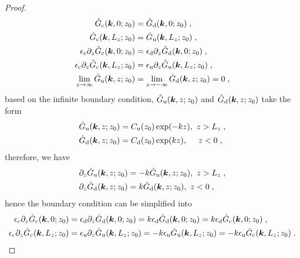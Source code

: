 \begin{proof}
    \begin{equation*}
        \begin{split}
            \Hat{G}_{\mathrm{c}}(\bm{k}, 0; z_0) &= \Hat{G}_{\mathrm{d}}(\bm{k}, 0; z_0)\;,\\
            \hat{G}_{\mathrm{c}}(\bm{k}, L_z; z_0) &= \hat{G}_{\mathrm{u}}(\bm{k}, L_z; z_0)\;,\\
            \epsilon_{\mathrm{c}} \partial_z\Hat{G}_{\mathrm{c}}(\bm{k}, 0; z_0) &= \epsilon_{\mathrm{d}} \partial_z\Hat{G}_{\mathrm{d}}(\bm{k}, 0; z_0)\;,\\
            \epsilon_{\mathrm{c}} \partial_z\Hat{G}_{\mathrm{c}}(\bm{k}, L_z; z_0) &= \epsilon_{\mathrm{u}} \partial_z\Hat{G}_{\mathrm{u}}(\bm{k}, L_z; z_0)\;,\\
            \lim_{z \to \infty} \Hat{G}_{\mathrm{u}}(\bm{k}, z; z_0) &= \lim_{z \to -\infty}\Hat{G}_{\mathrm{d}}(\bm{k}, z; z_0)  = 0\;,
        \end{split}
    \end{equation*}
based on the infinite boundary condition,  $\Hat{G}_{\mathrm{u}}(\bm{k}, z; z_0)$ and $\Hat{G}_{\mathrm{d}}(\bm{k}, z; z_0)$ take the form
\begin{align*}
    \Hat{G}_{\mathrm{u}}(\bm{k}, z; z_0)&=C_{\mathrm{u}}(z_0)\exp(-kz),~z > L_z\;,\\
     \Hat{G}_{\mathrm{d}}(\bm{k}, z; z_0)&=C_{\mathrm{d}}(z_0)\exp(kz),~~~~z < 0\;,
\end{align*}
therefore, we have 
\begin{align*}
    \partial_z\Hat{G}_{\mathrm{u}}(\bm{k}, z; z_0)&=-k\Hat{G}_{\mathrm{u}}(\bm{k}, z; z_0),~z > L_z\;,\\
     \partial_z\Hat{G}_{\mathrm{d}}(\bm{k}, z; z_0)&=k\Hat{G}_{\mathrm{d}}(\bm{k}, z; z_0),~z < 0\;,
\end{align*}
hence the boundary condition can be  simplified into
\begin{align*}
 \epsilon_{\mrm{c}}\partial_z\Hat{G}_{\mrm{c}}(\vk, 0; z_0)&=\epsilon_{\mrm{d}} \partial_z\Hat{G}_{\mrm{d}}(\vk, 0; z_0)=k\epsilon_{\mrm{d}} \Hat{G}_{\mrm{d}}(\vk, 0; z_0)=k\epsilon_{\mrm{d}} \Hat{G}_{\mrm{c}}(\vk, 0; z_0)\;,\\
  \epsilon_{\mrm{c}}\partial_z\Hat{G}_{\mrm{c}}(\vk, L_z; z_0)&=\epsilon_{\mrm{u}} \partial_z\Hat{G}_{\mrm{u}}(\vk, L_z; z_0)=-k\epsilon_{\mrm{u}} \Hat{G}_{\mrm{u}}(\vk, L_z; z_0)=-k\epsilon_{\mrm{u}} \Hat{G}_{\mrm{c}}(\vk, L_z; z_0)\;.

\end{align*}
\end{proof}
